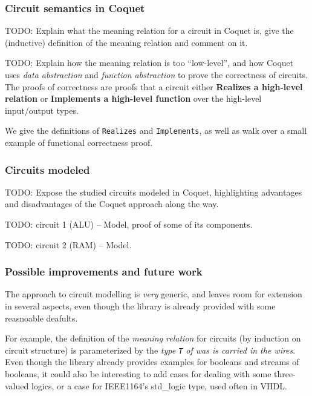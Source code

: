 \documentclass[a4paper]{article}
\begin{document}
            \subsubsection{Circuit semantics in Coquet}
            \label{subsubsec:coquet-semantics}
                TODO: Explain what the meaning relation for a circuit in Coquet is, give the
                (inductive) definition of the meaning relation and comment on it.

                TODO: Explain how the meaning relation is too ``low-level'', and how Coquet uses
                \emph{data abstraction} and \emph{function abstraction} to prove the correctness of
                circuits. The proofs of correctness are proofs that a circuit either
                \textbf{Realizes a high-level relation} or \textbf{Implements a high-level function}
                over the high-level input/output types.

                We give the definitions of \texttt{Realizes} and \texttt{Implements}, as well as
                walk over a small example of functional correctness proof.

            \subsubsection{Circuits modeled}
            \label{subsubsec:coquet-circuits}
                TODO: Expose the studied circuits modeled in Coquet, highlighting advantages and
                disadvantages of the Coquet approach along the way.

                TODO: circuit 1 (ALU) -- Model, proof of some of its components.

                TODO: circuit 2 (RAM) -- Model.

            \subsubsection{Possible improvements and future work}
            \label{subsubsec:coquet-improv}
                The approach to circuit modelling is \emph{very} generic, and leaves room for
                extension in several aspects, even though the library is already provided with some
                reasnoable deafults.

                For example, the definition of the \emph{meaning relation} for circuits (by
                induction on circuit structure) is parameterized by the \emph{type \texttt{T} of was
                    is carried in the wires}. Even though the library already provides examples for
                booleans and streams of booleans, it could also be interesting to add cases for
                dealing with some three-valued logics, or a case for IEEE1164's std\_logic type,
                used often in VHDL.
\end{document}
